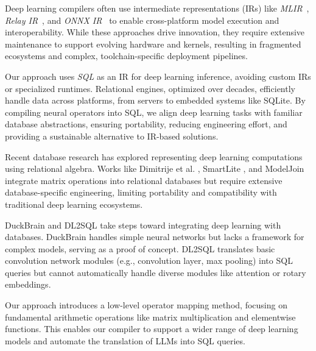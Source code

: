 Deep learning compilers often use intermediate representations (IRs) like \emph{MLIR}~\cite{mlir}, \emph{Relay IR}~\cite{Relay}, and \emph{ONNX IR}~\cite{onnx} to enable cross-platform model execution and interoperability. While these approaches drive innovation, they require extensive maintenance to support evolving hardware and kernels, resulting in fragmented ecosystems and complex, toolchain-specific deployment pipelines.

Our approach uses \emph{SQL} as an IR for deep learning inference, avoiding custom IRs or specialized runtimes. Relational engines, optimized over decades, efficiently handle data across platforms, from servers to embedded systems like SQLite. By compiling neural operators into SQL, we align deep learning tasks with familiar database abstractions, ensuring portability, reducing engineering effort, and providing a sustainable alternative to IR-based solutions.


Recent database research has explored representing deep learning computations using relational algebra. Works like Dimitrije et al. \cite{declaritive}, SmartLite \cite{smartlite}, and ModelJoin \cite{modeljoin} integrate matrix operations into relational databases but require extensive database-specific engineering, limiting portability and compatibility with traditional deep learning ecosystems.

DuckBrain \cite{duckbrain} and DL2SQL \cite{dl2sql} take steps toward integrating deep learning with databases. DuckBrain handles simple neural networks but lacks a framework for complex models, serving as a proof of concept. DL2SQL translates basic convolution network modules (e.g., convolution layer, max pooling) into SQL queries but cannot automatically handle diverse modules like attention or rotary embeddings.

Our approach introduces a low-level operator mapping method, focusing on fundamental arithmetic operations like matrix multiplication and elementwise functions. This enables our compiler to support a wider range of deep learning models and automate the translation of LLMs into SQL queries.